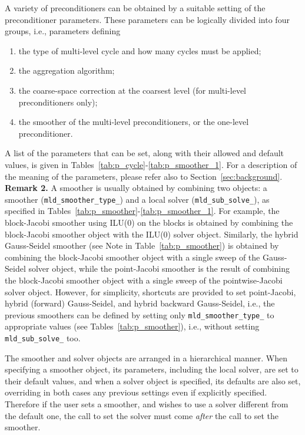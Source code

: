 A variety of preconditioners can be obtained
by a suitable setting of the preconditioner parameters. These parameters
can be logically divided into four groups, i.e., parameters defining
\begin{enumerate}
	\item the type of multi-level cycle and how many cycles must be applied;
        \item the aggregation algorithm;
        \item the coarse-space correction at the coarsest level (for multi-level
                 preconditioners only);
	\item the smoother of the multi-level preconditioners, or the one-level
                  preconditioner.
	
\end{enumerate}
A list of the parameters that can be set, along with their allowed and
default values, is given in Tables~\ref{tab:p_cycle}-\ref{tab:p_smoother_1}.
For a description of the meaning of the parameters, please
refer also to Section~\ref{sec:background}. \\

\textbf{Remark 2.} A smoother is usually obtained by combining two objects:
a smoother (\verb|mld_smoother_type_|) and a local solver (\verb|mld_sub_solve_|),
as specified in Tables~\ref{tab:p_smoother}-\ref{tab:p_smoother_1}.
For example, the block-Jacobi smoother using
ILU(0) on the blocks is obtained by combining the block-Jacobi smoother
object with the ILU(0) solver object. Similarly,
the hybrid Gauss-Seidel smoother (see Note in Table~\ref{tab:p_smoother})
is obtained by combining the block-Jacobi smoother object with a single sweep
of the Gauss-Seidel solver object, while the point-Jacobi smoother is the
result of combining the block-Jacobi smoother object with a single sweep
of the pointwise-Jacobi solver object. However, for simplicity, shortcuts are
provided to set point-Jacobi, hybrid (forward) Gauss-Seidel, and
hybrid backward Gauss-Seidel, i.e., the previous smoothers can be defined
by setting only \verb|mld_smoother_type_| to appropriate values (see
Tables~\ref{tab:p_smoother}), i.e., without setting
\verb|mld_sub_solve_| too.

The smoother and solver objects are arranged in a
hierarchical manner. When specifying a smoother object, its parameters,
including the local solver, are set to their default values, and when a solver
object is specified, its defaults are also set, overriding in both
cases any previous settings even if explicitly specified. Therefore if
the user sets a smoother, and wishes to use a solver
different from  the default one, the call to set the solver must come
\emph{after} the call to set the smoother. 

